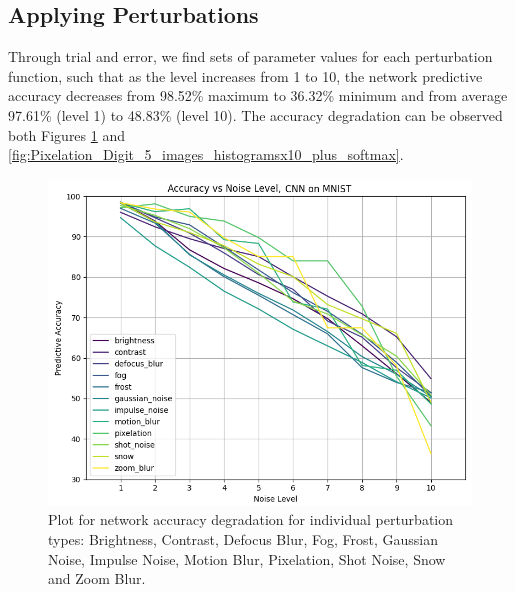 
\subsection{Applying Perturbations}
Through trial and error, we find sets of parameter values
for each perturbation function, such that as the level increases from 1 to
10, the network predictive accuracy decreases from 98.52\%
maximum to 36.32\% minimum and from average 97.61\%
(level 1) to 48.83\% (level 10). The accuracy degradation can be observed both Figures 
\ref{fig:Accuracy_vs_Noise_types} and \ref{fig:Pixelation_Digit_5_images_histogramsx10_plus_softmax}.

\begin{figure}[h] 
\begin{center}
\includegraphics[width=0.99\columnwidth]{Figures/accuracy_vs_noise_types_plot.png}
\end{center}
\caption{Plot for network accuracy degradation for individual perturbation types: Brightness, Contrast, Defocus Blur, Fog, Frost, Gaussian Noise, Impulse Noise, Motion Blur, Pixelation, Shot Noise, Snow and Zoom Blur.}
\label{fig:Accuracy_vs_Noise_types}
\end{figure}

